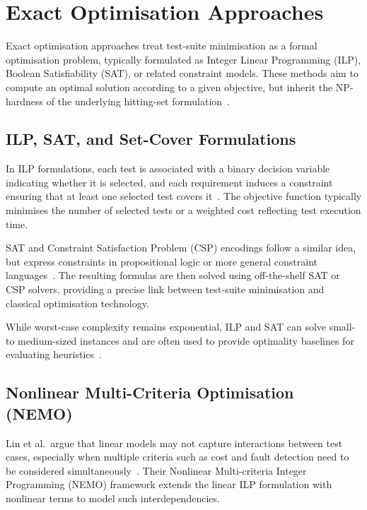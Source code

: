 \section{Exact Optimisation Approaches}

Exact optimisation approaches treat test-suite minimisation as a formal
optimisation problem, typically formulated as Integer Linear Programming
(ILP), Boolean Satisfiability (SAT), or related constraint models.
These methods aim to compute an optimal solution according to a given objective,
but inherit the NP-hardness of the underlying hitting-set formulation~\cite{garey1979}.

\subsection{ILP, SAT, and Set-Cover Formulations}

In ILP formulations, each test is associated with a binary decision variable
indicating whether it is selected, and each requirement induces a constraint
ensuring that at least one selected test covers it~\cite{yoo2012,elbaum2002}.
The objective function typically minimises the number of selected tests or
a weighted cost reflecting test execution time.

SAT and Constraint Satisfaction Problem (CSP) encodings follow a similar idea,
but express constraints in propositional logic or more general constraint
languages~\cite{hemmati2011}. The resulting formulas are then solved using
off-the-shelf SAT or CSP solvers, providing a precise link between test-suite
minimisation and classical optimisation technology.

While worst-case complexity remains exponential, ILP and SAT can solve
small- to medium-sized instances and are often used to provide optimality
baselines for evaluating heuristics~\cite{yoo2012,khan2020}.

\subsection{Nonlinear Multi-Criteria Optimisation (NEMO)}

Lin et al.\ argue that linear models may not capture interactions between
test cases, especially when multiple criteria such as cost and fault detection
need to be considered simultaneously~\cite{lin2018}. Their Nonlinear
Multi-criteria Integer Programming (NEMO) framework extends the linear ILP
formulation with nonlinear terms to model such interdependencies.

